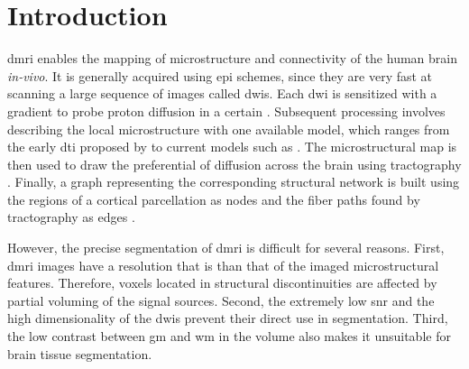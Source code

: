 \section{Introduction}\label{sec:regseg-intro}
\Acrlong*{dmri} enables the mapping of microstructure \citep{basser_microstructural_1996}
  and connectivity \citep{craddock_imaging_2013} of the human brain \emph{in-vivo}.
It is generally acquired using \gls*{epi} schemes, since they are very fast at
  scanning a large sequence of images called \glspl*{dwi}.
Each \gls*{dwi} is sensitized with a gradient to probe proton diffusion in a certain
  .
Subsequent processing involves describing the local microstructure with one available
  model, which ranges from the early \gls*{dti} proposed by \cite{basser_microstructural_1996}
  to current models such as \citep{daducci_accelerated_2015}.
The microstructural map is then used to draw the preferential  of diffusion
  across the brain using tractography \citep{mori_threedimensional_1999}.
Finally, a graph representing the corresponding structural network is built using
  the regions of a cortical parcellation as nodes and the fiber paths found by
  tractography as edges \citep{hagmann_mapping_2008}.

%
However, the precise segmentation of \gls*{dmri} is difficult for several reasons.
First, \gls{dmri} images have a resolution that is 
  than that of the imaged microstructural features.
Therefore, voxels located in structural discontinuities are affected by partial
  voluming of the signal sources.
Second, the extremely low \gls*{snr} and the high dimensionality of the \glspl*{dwi} prevent
  their direct use in segmentation.
Third, the low contrast between \gls*{gm} and \gls*{wm} in the \lowb{} volume also makes
  it unsuitable for brain tissue segmentation.

